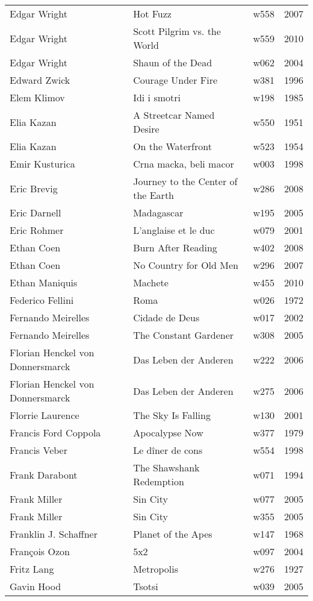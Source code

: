 \documentclass{article}
\begin{document}
\begin {center}
\begin{longtable}{l p{10cm} l l}
Edgar Wright & Hot Fuzz & w558 & 2007 \\
Edgar Wright & Scott Pilgrim vs. the World & w559 & 2010 \\
Edgar Wright & Shaun of the Dead & w062 & 2004 \\
Edward Zwick & Courage Under Fire & w381 & 1996 \\
Elem Klimov & Idi i smotri & w198 & 1985 \\
Elia Kazan & A Streetcar Named Desire & w550 & 1951 \\
Elia Kazan & On the Waterfront & w523 & 1954 \\
Emir Kusturica & Crna macka, beli macor & w003 & 1998 \\
Eric Brevig & Journey to the Center of the Earth & w286 & 2008 \\
Eric Darnell & Madagascar & w195 & 2005 \\
Eric Rohmer & L'anglaise et le duc & w079 & 2001 \\
Ethan Coen & Burn After Reading & w402 & 2008 \\
Ethan Coen & No Country for Old Men & w296 & 2007 \\
Ethan Maniquis & Machete & w455 & 2010 \\
Federico Fellini & Roma & w026 & 1972 \\
Fernando Meirelles & Cidade de Deus & w017 & 2002 \\
Fernando Meirelles & The Constant Gardener & w308 & 2005 \\
Florian Henckel von Donnersmarck & Das Leben der Anderen & w222 & 2006 \\
Florian Henckel von Donnersmarck & Das Leben der Anderen & w275 & 2006 \\
Florrie Laurence & The Sky Is Falling & w130 & 2001 \\
Francis Ford Coppola & Apocalypse Now & w377 & 1979 \\
Francis Veber & Le dîner de cons & w554 & 1998 \\
Frank Darabont & The Shawshank Redemption & w071 & 1994 \\
Frank Miller & Sin City & w077 & 2005 \\
Frank Miller & Sin City & w355 & 2005 \\
Franklin J. Schaffner & Planet of the Apes & w147 & 1968 \\
François Ozon & 5x2 & w097 & 2004 \\
Fritz Lang & Metropolis & w276 & 1927 \\
Gavin Hood & Tsotsi & w039 & 2005 \\

\end{longtable}
\end{center}
\end{document}
